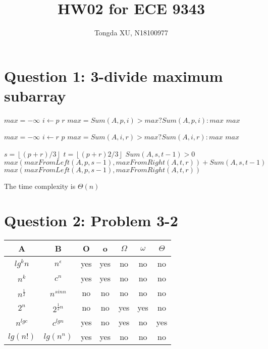 \documentclass[]{article}
\title{HW02 for ECE 9343}
\author{Tongda XU, N18100977}
\begin{document}
\maketitle

\section{Question 1: 3-divide maximum subarray}

\begin{codebox}
	\li $max = -\infty$
	\li \For $i \gets p$ \To $r$
	\li		\Do $max = Sum(A,p,i)>max?Sum(A,p,i):max$
 		\End
	\li \Return $max$
\end{codebox}

\begin{codebox}
	\li $max = -\infty$
	\li \For $i \gets r$ \Downto $p$
	\li		\Do $max = Sum(A,i,r)>max?Sum(A,i,r):max$
	\End
	\li \Return $max$
\end{codebox}

\begin{codebox}
	\li $s = \left \lfloor (p+r)/3 \right \rfloor$
	\li $t = \left \lfloor (p+r)2/3 \right \rfloor$
	\li \If $Sum(A,s,t-1) > 0$
	\li 	\Then \Return $max(maxFromLeft(A, p, s-1), maxFromRight(A, t, r)) + Sum(A,s,t-1)$
	\li	\Else \Return $max(maxFromLeft(A, p, s-1), maxFromRight(A, t, r))$
	\End
\end{codebox}

The time complexity is $\Theta(n)$

\section{Question 2: Problem 3-2}

\begin{tabular}{c c c c c c c}

	A & B & O & o & $\Omega$ & $\omega$ & $\Theta$ \\ 
	\hline 
	$lg^kn$ & $n^\epsilon$ & yes & yes & no & no & no \\ 
	\hline 
	$n^k$ & $c^n$ & yes & yes & no & no & no \\ 
	\hline 
	$n^{\frac{1}{2}}$ & $n^{sinn}$ & no & no & no & no & no \\ 
	\hline 
	$2^{n}$ & $2^{\frac{1}{2}n}$ & no & no & yes & yes & no \\ 
	\hline 
	$n^{lgc}$ & $c^{lgn}$ & yes & no & yes & no & yes \\ 
	\hline 
	$lg(n!)$ & $lg(n^n)$ & yes & yes & no & no & no \\ 
	
\end{tabular} 
\end{document}
